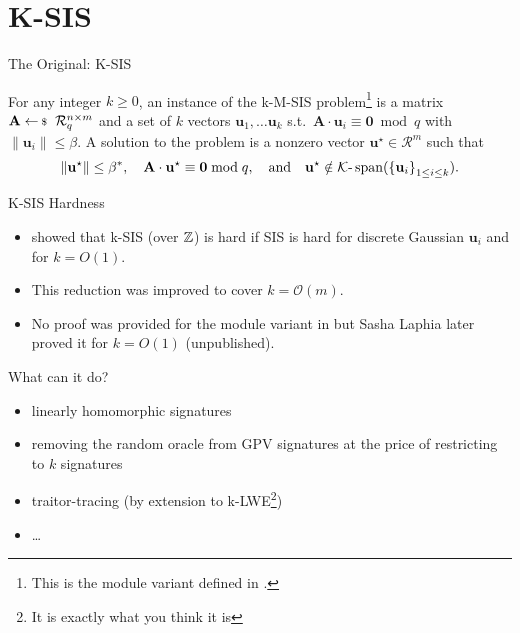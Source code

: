 \documentclass[xcolor=table,10pt,aspectratio=169]{beamer}
\renewcommand{\vec}[1]{\ensuremath{\mathbf{#1}}\xspace}
\providecommand{\mat}[1]{\ensuremath{\vec{#1}}\xspace}
\providecommand{\ring}[0]{\ensuremath{\mathcal{R}}\xspace}
\begin{document}
\section{K-SIS}
\label{sec:org3adbde9}

\begin{frame}[label={sec:org962542d}]{The Original: K-SIS}
\begin{definition}
For any integer \(k \geq 0\), an instance of the k-M-SIS problem\footnote{This is the module variant defined in \cite{C:ACLMT22}.} is a matrix \(\mat{A} \sample \ring_{q}^{n \times m}\) and a set of \(k\) vectors \(\vec{u}_{1}, \ldots \vec{u}_{k}\) s.t. \(\mat{A}\cdot \vec{u}_{i} \equiv \vec{0} \bmod q\) with \(\|{\vec{u}_i}\| \leq \beta\). A solution to the problem is a nonzero vector \(\vec{u}^{\star} \in \ring^{m}\) such that
\[\|{\vec{u}^{\star}}\| \leq \beta^*, \quad \mat{A}\cdot \vec{u}^{\star} \equiv \vec{0} \bmod q,\quad \text{and} \quad \vec{u}^{\star} \notin \mathcal{K}\text{-}\operatorname{span}(\set{\vec{u}_i}_{1 \leq i \le k}).\]
\end{definition}

{\footnotesize {} \par}
\end{frame}

\begin{frame}[label={sec:orgc7c2e74}]{K-SIS Hardness}
\begin{itemize}
\item \cite{PKC:BonFre11} showed that k-SIS (over \(\mathbb{Z}\)) is hard if SIS is hard for discrete Gaussian \(\vec{u}_{i}\) and for \(k = O(1)\).
\item This reduction was improved to cover \(k = \mathcal{O}(m)\).
\item No proof was provided for the module variant in \cite{C:ACLMT22} but Sasha Laphia later proved it for \(k = O(1)\) (unpublished).
\end{itemize}
\end{frame}

\begin{frame}[label={sec:orgf0280cf}]{What can it do?}
\begin{itemize}
\item linearly homomorphic signatures
\item removing the random oracle from GPV signatures at the price of restricting to \(k\) signatures
\item traitor-tracing (by extension to k-LWE\footnote{It is exactly what you think it is})
\item …
\end{itemize}
\end{frame}
\end{document}
